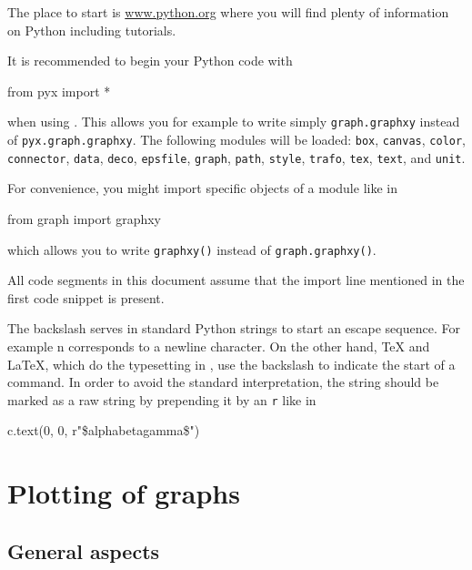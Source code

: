 \documentclass[11pt,DIV14]{scrartcl}
\begin{document}
{}
{The place to start is \url{www.python.org} where you will find plenty of
information on Python including tutorials.
}

{}
{It is recommended to begin your Python code with 
\begin{progcode}
from pyx import *
\end{progcode}
when using \PyX. This allows you for example to write simply 
\texttt{graph.graphxy}
instead of \texttt{pyx.graph.graphxy}. The following modules will be loaded:
\texttt{box}, \texttt{canvas}, \texttt{color}, \texttt{connector}, \texttt{data},
\texttt{deco}, \texttt{epsfile}, \texttt{graph}, \texttt{path},
\texttt{style}, \texttt{trafo}, \texttt{tex}, \texttt{text}, and
\texttt{unit}.

For convenience, you might import specific objects of a module like in
\begin{progcode}
from graph import graphxy
\end{progcode}
which allows you to write \texttt{graphxy()} instead of \texttt{graph.graphxy()}.

All code segments in this document assume that the import line mentioned in
the first code snippet is present.
}

{}
{\label{q:raw_string}
The backslash serves in standard Python strings to start an escape sequence.
For example {\cs n} corresponds to a newline character. On the other hand,
\TeX{} and \LaTeX{}, which do the typesetting in \PyX, use the backslash to
indicate the start of a command. In order to avoid the standard interpretation,
the string should be marked as a raw string by prepending it by an \texttt{r} 
like in
\begin{progcode}
c.text(0, 0, r"\${\cs alpha}{\cs beta}{\cs gamma}\$")
\end{progcode}
}

\section{Plotting of graphs}

\subsection{General aspects}
\end{document}
